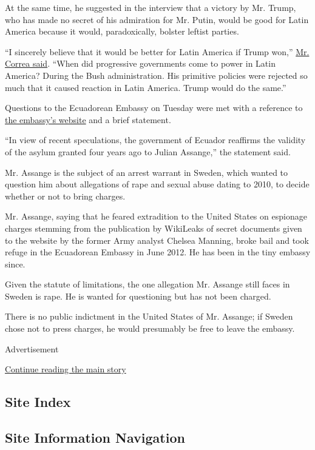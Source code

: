 At the same time, he suggested in the interview that a victory by Mr.
Trump, who has made no secret of his admiration for Mr. Putin, would be
good for Latin America because it would, paradoxically, bolster leftist
parties.

``I sincerely believe that it would be better for Latin America if Trump
won,''
\href{https://www.rt.com/news/361312-ecuador-president-interview-trump/}{Mr.
Correa said}. ``When did progressive governments come to power in Latin
America? During the Bush administration. His primitive policies were
rejected so much that it caused reaction in Latin America. Trump would
do the same.''

Questions to the Ecuadorean Embassy on Tuesday were met with a reference
to
\href{http://reinounido.embajada.gob.ec/ecuador-ratifies-the-validity-of-the-asylum-granted-to-julian-assange/}{the
embassy's website} and a brief statement.

``In view of recent speculations, the government of Ecuador reaffirms
the validity of the asylum granted four years ago to Julian Assange,''
the statement said.

Mr. Assange is the subject of an arrest warrant in Sweden, which wanted
to question him about allegations of rape and sexual abuse dating to
2010, to decide whether or not to bring charges.

Mr. Assange, saying that he feared extradition to the United States on
espionage charges stemming from the publication by WikiLeaks of secret
documents given to the website by the former Army analyst Chelsea
Manning, broke bail and took refuge in the Ecuadorean Embassy in June
2012. He has been in the tiny embassy since.

Given the statute of limitations, the one allegation Mr. Assange still
faces in Sweden is rape. He is wanted for questioning but has not been
charged.

There is no public indictment in the United States of Mr. Assange; if
Sweden chose not to press charges, he would presumably be free to leave
the embassy.

Advertisement

\protect\hyperlink{after-bottom}{Continue reading the main story}

\hypertarget{site-index}{%
\subsection{Site Index}\label{site-index}}

\hypertarget{site-information-navigation}{%
\subsection{Site Information
Navigation}\label{site-information-navigation}}

